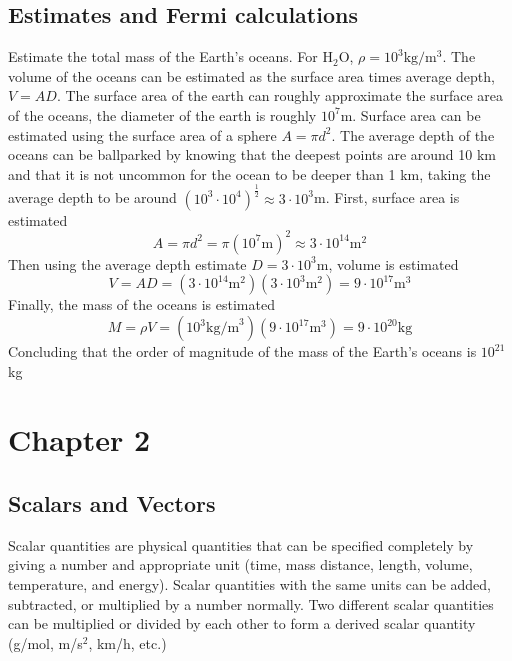 \documentclass[a4paper]{article}
\begin{document}
    \subsection{Estimates and Fermi calculations}
    Estimate the total mass of the Earth's oceans. For H$_2$O, $\rho = 10^3 \text{kg/m$^3$}$. The volume of the oceans can be estimated as the surface area times average depth, $V = AD$. The surface area of the  earth can roughly approximate the surface area of the oceans, the diameter of the earth is roughly $10^7$m. Surface area can be estimated using the surface area of a sphere $A = \pi d^2$. The average depth of the oceans can be ballparked by knowing that the deepest points are around 10 km and that it is not uncommon for the ocean to be deeper than 1 km, taking the average depth to be around $(10^3 \cdot 10^4)^{\frac{1}{2}} \approx 3\cdot 10^3$m. First, surface area is estimated
    \begin{equation}
        A = \pi d^2 = \pi (10^7\text{m})^2 \approx 3 \cdot 10^{14} \text{m}^2
    \end{equation}
    Then using the average depth estimate $D = 3 \cdot 10^3$m, volume is estimated
    \begin{equation}
        V = AD = (3 \cdot 10^{14}\text{m}^2)(3 \cdot 10^3\text{m}^2) = 9 \cdot 10^{17}\text{m}^3
    \end{equation}
    Finally, the mass of the oceans is estimated
    \begin{equation}
        M = \rho V = (10^3\text{kg/m}^3)(9 \cdot 10^{17}\text{m}^3) = 9 \cdot 10^{20}\text{kg}
    \end{equation}
    Concluding that the order of magnitude of the mass of the Earth's oceans is $10^{21}$kg

    \section{Chapter 2}
    \subsection{Scalars and Vectors}
    Scalar quantities are physical quantities that can be specified completely by giving a number and appropriate unit (time, mass distance, length, volume, temperature, and energy). Scalar quantities with the same units can be added, subtracted, or multiplied by a number normally. Two different scalar quantities can be multiplied or divided by each other to form a derived scalar quantity (g/mol, m/s$^2$, km/h, etc.) 
    
\end{document}
